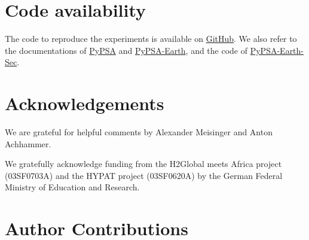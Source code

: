 \documentclass[5p,numafflabel]{elsarticle}
\begin{document}
\section*{Code availability}
The code to reproduce the experiments is available on \href{https://github.com/energyLS/aldehyde}{GitHub}.
We also refer to the documentations of \href{https://pypsa.readthedocs.io}{PyPSA} and  \href{https://pypsa-earth.readthedocs.io}{PyPSA-Earth}, and the code of 
\href{https://github.com/pypsa-meets-earth/pypsa-earth-sec}{PyPSA-Earth-Sec}.



\renewcommand{\ttdefault}{\sfdefault}



\section*{Acknowledgements}

We are grateful for helpful comments by Alexander Meisinger and Anton Achhammer.

We gratefully acknowledge funding from the H2Global meets Africa project (03SF0703A) and the HYPAT project (03SF0620A) by the German Federal Ministry of Education and Research.



\section*{Author Contributions}

\end{document}

